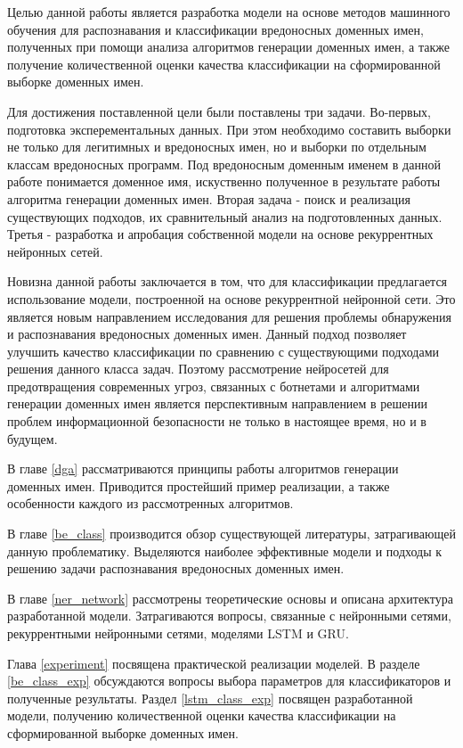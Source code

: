 Целью данной работы является разработка модели на основе методов машинного обучения для распознавания и классификации вредоносных доменных имен, полученных при помощи анализа алгоритмов генерации доменных имен, а также получение количественной оценки качества классификации на сформированной выборке доменных имен.

Для достижения поставленной цели были поставлены три задачи. Во-первых, подготовка эксперементальных данных. При этом необходимо составить выборки не только для легитимных и вредоносных имен, но и выборки по отдельным классам вредоносных программ. Под вредоносным доменным именем в данной работе понимается доменное имя, искуственно полученное в результате работы алгоритма генерации доменных имен. Вторая задача - поиск и реализация существующих подходов, их сравнительный анализ на подготовленных данных. Третья - разработка и апробация собственной модели на основе рекуррентных нейронных сетей.

Новизна данной работы заключается в том, что для классификации предлагается использование модели, построенной на основе рекуррентной нейронной сети. Это является новым направлением исследования для решения проблемы обнаружения и распознавания вредоносных доменных имен. Данный подход позволяет улучшить качество классификации по сравнению с существующими подходами решения данного класса задач. Поэтому рассмотрение нейросетей для предотвращения современных угроз, связанных с ботнетами и алгоритмами генерации доменных имен является перспективным направлением в решении проблем информационной безопасности не только в настоящее время, но и в будущем.

В главе \ref{dga} рассматриваются принципы работы алгоритмов генерации доменных имен. Приводится простейший пример реализации, а также особенности каждого из рассмотренных алгоритмов.

В главе \ref{be_class} производится обзор существующей литературы, затрагивающей данную проблематику. Выделяются наиболее эффективные модели и подходы к решению задачи распознавания вредоносных доменных имен.

В главе \ref{ner_network} рассмотрены теоретические основы и описана архитектура разработанной модели. Затрагиваются вопросы, связанные с нейронными сетями, рекуррентными нейронными сетями, моделями LSTM и GRU.

Глава \ref{experiment} посвящена практической реализации моделей. В разделе \ref{be_class_exp} обсуждаются вопросы выбора параметров для классификаторов и полученные результаты. Раздел \ref{lstm_class_exp} посвящен разработанной модели, получению количественной оценки качества классификации на сформированной выборке доменных имен.
\clearpage